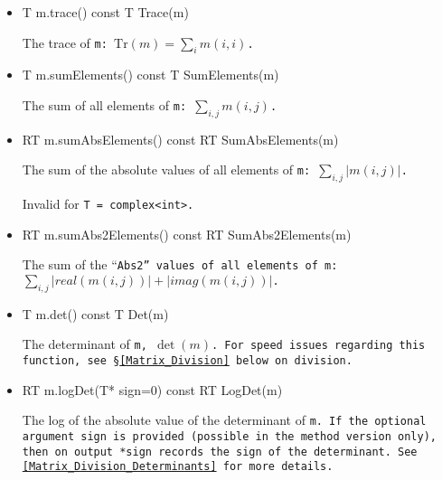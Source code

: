 \begin{itemize}
\item
\begin{tmvcode}
T m.trace() const
T Trace(m)
\end{tmvcode}
The trace of \tt{m}: $\mathrm{Tr}(m) = \sum_i m(i,i)$.

\item
\begin{tmvcode}
T m.sumElements() const
T SumElements(m)
\end{tmvcode}
The sum of all elements of \tt{m}: $\sum_{i,j} m(i,j)$.

\item
\begin{tmvcode}
RT m.sumAbsElements() const
RT SumAbsElements(m)
\end{tmvcode}
The sum of the absolute values of all elements of \tt{m}: $\sum_{i,j} |m(i,j)|$.

Invalid for \tt{T = complex<int>}.

\item
\begin{tmvcode}
RT m.sumAbs2Elements() const
RT SumAbs2Elements(m)
\end{tmvcode}
The sum of the ``\tt{Abs2}'' values of all elements of \tt{m}: $\sum_{i,j} |real(m(i,j))| + |imag(m(i,j))|$.

\item
\begin{tmvcode}
T m.det() const
T Det(m)
\end{tmvcode}
The determinant of \tt{m}, $\det(m)$.  For speed issues regarding this function, see 
\S\ref{Matrix_Division} below on division.

\item
\begin{tmvcode}
RT m.logDet(T* sign=0) const
RT LogDet(m)
\end{tmvcode}
The log of the absolute value of the determinant of \tt{m}.  If the optional argument \tt{sign} is 
provided (possible in the method version only), then on output \tt{*sign} records the sign of the determinant.  See \ref{Matrix_Division_Determinants} 
for more details.  


\end{itemize}

